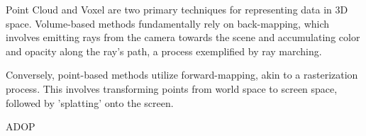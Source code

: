 Point Cloud and Voxel are two primary techniques 
for representing data in 3D space. 
Volume-based methods fundamentally rely on back-mapping, 
which involves emitting rays from the camera towards the scene 
and accumulating color and opacity along the ray's path, 
a process exemplified by ray marching. 

Conversely, point-based methods utilize forward-mapping, 
akin to a rasterization process. 
This involves transforming points from world space to screen space, 
followed by 'splatting' onto the screen.



ADOP
